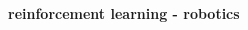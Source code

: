\documentclass{beamer}
\begin{document}
\begin{frame}{\bf reinforcement learning - robotics}

  \begin{columns}

    \begin{column}{0.5\textwidth}
    \end{column}


\end{columns}
\end{frame}
\end{document}
